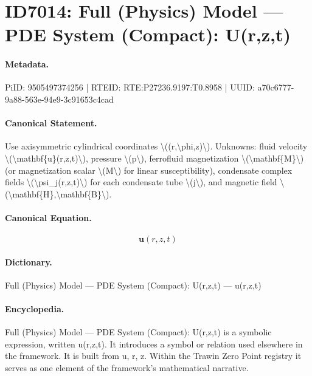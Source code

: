 \section*{ID7014: Full (Physics) Model — PDE System (Compact): U(r,z,t)}
\paragraph{Metadata.}
PiID: 9505497374256 | RTEID: RTE:P27236.9197:T0.8958 | UUID: a70c6777-9a88-563e-94e9-3c91653c4cad

\paragraph{Canonical Statement.}
Use axisymmetric cylindrical coordinates \textbackslash{}((r,\textbackslash{}phi,z)\textbackslash{}). Unknowns: fluid velocity \textbackslash{}(\textbackslash{}mathbf\{u\}(r,z,t)\textbackslash{}), pressure \textbackslash{}(p\textbackslash{}), ferrofluid magnetization \textbackslash{}(\textbackslash{}mathbf\{M\}\textbackslash{}) (or magnetization scalar \textbackslash{}(M\textbackslash{}) for linear susceptibility), condensate complex fields \textbackslash{}(\textbackslash{}psi\_j(r,z,t)\textbackslash{}) for each condensate tube \textbackslash{}(j\textbackslash{}), and magnetic field \textbackslash{}(\textbackslash{}mathbf\{H\},\textbackslash{}mathbf\{B\}\textbackslash{}).

\paragraph{Canonical Equation.}
\[
\mathbf{u}(r,z,t)
\]

\paragraph{Dictionary.}
Full (Physics) Model — PDE System (Compact): U(r,z,t) — u(r,z,t)

\paragraph{Encyclopedia.}
Full (Physics) Model — PDE System (Compact): U(r,z,t) is a symbolic expression, written u(r,z,t). It introduces a symbol or relation used elsewhere in the framework. It is built from u, r, z. Within the Trawin Zero Point registry it serves as one element of the framework's mathematical narrative.
